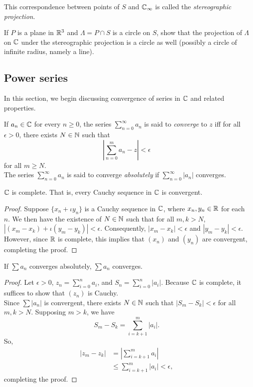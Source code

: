 	This correspondence between points of $S$ and $\mathbb{C}_\infty$ is called the \emph{stereographic projection}. 

	\begin{exercise}
		If $P$ is a plane in $\mathbb{R}^3$ and $\Lambda = P \cap S$ is a circle on $S$, show that the projection of $\Lambda$ on $\mathbb{C}$ under the stereographic projection is a circle as well (possibly a circle of infinite radius, namely a line).
	\end{exercise}

\subsection{Power series}

	In this section, we begin discussing convergence of series in $\mathbb{C}$ and related properties.

	\begin{fdef}
		If $a_n \in \mathbb{C}$ for every $n \ge 0$, the series $\sum_{n=0}^\infty a_n$ is said to \emph{converge} to $z$ iff for all $\epsilon>0$, there exists $N \in \mathbb{N}$ such that
		\[ \left| \sum_{n=0}^m a_n - z  \right| < \epsilon \]
		for all $m \ge N$.\\
		The series $\sum_{n=0}^\infty a_n$ is said to converge \emph{absolutely} if $\sum_{n=0}^\infty |a_n|$ converges.
	\end{fdef}

	\begin{theorem}
		$\mathbb{C}$ is complete. That is, every Cauchy sequence in $\mathbb{C}$ is convergent.
	\end{theorem}
	\begin{proof}
		Suppose $\{x_n + \iota y_n\}$ is a Cauchy sequence in $\mathbb{C}$, where $x_n, y_n \in \mathbb{R}$ for each $n$. We then have the existence of $N \in \mathbb{N}$ such that for all $m,k > N$, $|(x_m - x_k) + \iota(y_m - y_k)| < \epsilon$. Consequently, $|x_m - x_k| < \epsilon$ and $|y_m - y_k| < \epsilon$. However, since $\mathbb{R}$ is complete, this implies that $(x_n)$ and $(y_n)$ are convergent, completing the proof. 
	\end{proof}	

	\begin{theorem}
		If $\sum a_n$ converges absolutely, $\sum a_n$ converges.
	\end{theorem}
	\begin{proof}
		Let $\epsilon > 0$, $z_n = \sum_{i=0}^n a_i$, and $S_n = \sum_{i=0}^n |a_i|$. Because $\mathbb{C}$ is complete, it suffices to show that $(z_n)$ is Cauchy. \\
		Since $\sum |a_n|$ is convergent, there exists $N \in \mathbb{N}$ such that $|S_m - S_k| < \epsilon$ for all $m,k > N$. Supposing $m > k$, we have
		\[ S_m - S_k = \sum_{i=k+1}^m |a_i|. \]
		So,
		\begin{align*}
			|z_m - z_k| &= \left| \sum_{i=k+1}^m a_i \right| \\
				&\le \sum_{i=k+1}^m |a_i| < \epsilon,
		\end{align*}
		completing the proof.
	\end{proof}

